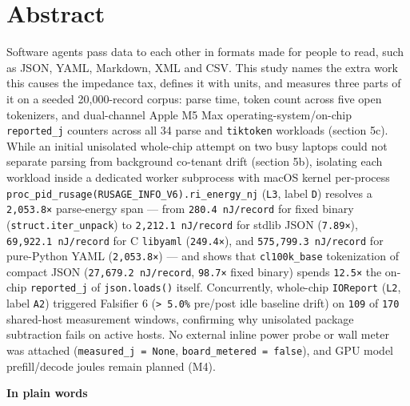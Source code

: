 \documentclass[10pt,letterpaper]{article}
\begin{document}
\section{Abstract}\label{abstract}

Software agents pass data to each other in formats made for people to
read, such as JSON, YAML, Markdown, XML and CSV. This study names the
extra work this causes the impedance tax, defines it with units, and
measures three parts of it on a seeded 20,000-record corpus: parse time,
token count across five open tokenizers, and dual-channel Apple M5 Max
operating-system/on-chip \texttt{reported\_j} counters across all 34
parse and \texttt{tiktoken} workloads (section 5c). While an initial
unisolated whole-chip attempt on two busy laptops could not separate
parsing from background co-tenant drift (section 5b), isolating each
workload inside a dedicated worker subprocess with macOS kernel
per-process \texttt{proc\_\allowbreak{}pid\_\allowbreak{}rusage(\allowbreak{}RUSAGE\_\allowbreak{}INFO\_\allowbreak{}V6).\allowbreak{}ri\_\allowbreak{}energy\_\allowbreak{}nj}
(\texttt{L3}, label \texttt{D}) resolves a \texttt{2,053.8×}
parse-energy span --- from \texttt{280.\allowbreak{}4\ nJ/\allowbreak{}record} for fixed binary
(\texttt{struct.\allowbreak{}iter\_\allowbreak{}unpack}) to \texttt{2,\allowbreak{}212.\allowbreak{}1\ nJ/\allowbreak{}record} for stdlib
JSON (\texttt{7.89×}), \texttt{69,\allowbreak{}922.\allowbreak{}1\ nJ/\allowbreak{}record} for C
\texttt{libyaml} (\texttt{249.4×}), and \texttt{575,\allowbreak{}799.\allowbreak{}3\ nJ/\allowbreak{}record}
for pure-Python YAML (\texttt{2,053.8×}) --- and shows that
\texttt{cl100k\_base} tokenization of compact JSON
(\texttt{27,\allowbreak{}679.\allowbreak{}2\ nJ/\allowbreak{}record}, \texttt{98.7×} fixed binary) spends
\texttt{12.5×} the on-chip \texttt{reported\_j} of \texttt{json.loads()}
itself. Concurrently, whole-chip \texttt{IOReport} (\texttt{L2}, label
\texttt{A2}) triggered Falsifier 6 (\texttt{\textgreater{}\ 5.0\%}
pre/post idle baseline drift) on \texttt{109} of \texttt{170}
shared-host measurement windows, confirming why unisolated package
subtraction fails on active hosts. No external inline power probe or
wall meter was attached (\texttt{measured\_\allowbreak{}j\ =\ None},
\texttt{board\_\allowbreak{}metered\ =\ false}), and GPU model prefill/decode joules
remain planned (M4).

\textbf{In plain words}
\end{document}

